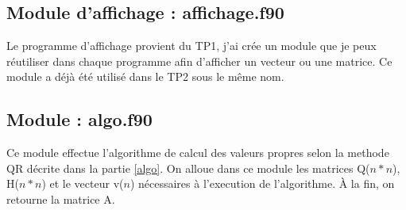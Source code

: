 \documentclass{report}
\begin{document}
\newpage
\subsection{Module d'affichage : affichage.f90}
Le programme d'affichage provient du TP1, j'ai crée un module que je peux réutiliser
dans chaque programme afin d'afficher un vecteur ou une matrice. Ce module a déjà été
utilisé dans le TP2 sous le même nom.

\subsection{Module : algo.f90}
Ce module effectue l'algorithme de calcul des valeurs propres selon la methode QR décrite 
dans la partie \ref{algo}. On alloue dans ce module les matrices Q($n*n$), H($n*n$) et le 
vecteur v($n$) nécessaires à l'execution de l'algorithme. À la fin, on retourne la matrice A.
\end{document}
